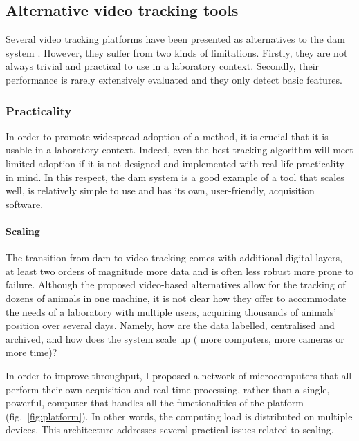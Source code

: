 \subsection{Alternative video tracking tools}

Several video tracking platforms have been presented as alternatives to the \gls{dam} system
\cite{zimmerman_video_2008,donelson_high-resolution_2012,gilestro_video_2012,faville_how_2015,murphy_postprandial_2016}.
However, they suffer from two kinds of limitations.
Firstly, they are not always trivial and practical to use in a laboratory context. 
Secondly, their performance is rarely extensively evaluated and they only detect basic features.

\subsubsection{Practicality}
In order to promote widespread adoption of a method, it is crucial that it is usable in a laboratory context.
Indeed, even the best tracking algorithm will meet limited adoption if it is not designed and implemented with real-life practicality in mind.
In this respect, the \gls{dam} system is a good example of a tool that scales well, is relatively simple to use and has its own, user-friendly, acquisition software.

\paragraph*{Scaling}
The transition from \gls{dam} to video tracking comes with additional digital layers, at least two orders of magnitude more data and is often less robust\emd{}\ie{} more prone to failure.
Although the proposed video-based alternatives 
allow for the tracking of dozens of animals in one machine, it is not clear how they offer
to accommodate the needs of a laboratory with multiple users, acquiring thousands of animals' position over several days\cite{zimmerman_video_2008,donelson_high-resolution_2012,gilestro_video_2012,faville_how_2015}.
Namely, how are the data labelled, centralised and archived, and how does the system scale up (\eg{} more computers, more cameras or more time)?

In order to improve throughput, I proposed a network of microcomputers that all perform their own acquisition and real-time processing, rather than a single, powerful, computer that handles all the functionalities of the platform (fig.~\ref{fig:platform}).
In other words, the computing load is distributed on multiple devices.
This architecture addresses several practical issues related to scaling.
 

